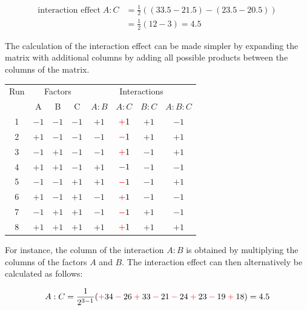 \begin{equation}
  \begin{split}
    \text{interaction effect}\; A:C &= \frac{1}{2}((33.5-21.5)-(23.5-20.5))\\
    &= \frac{1}{2}(12-3) = 4.5
  \end{split}
\end{equation}

The calculation of the interaction effect can be made simpler by expanding the matrix with additional columns by adding all possible
products between the columns of the matrix.
\begin{table}[H]
  \centering
  \scriptsize
  \begin{tabular}{c|ccc|cccc}
    Run & \multicolumn{3}{c}{Factors} & \multicolumn{4}{c}{Interactions} \\
        & A    & B    & C             & $A:B$ & $A:C$                         & $B:C$ & $A:B:C$  \\ \hline
     1  & $-1$ & $-1$ & $-1$          & $+1$  & $\color{red}+\color{black}1$  & $+1$  & $-1$ \\
     2  & $+1$ & $-1$ & $-1$          & $-1$  & $\color{red}-\color{black}1$  & $+1$  & $+1$ \\
     3  & $-1$ & $+1$ & $-1$          & $-1$  & $\color{red}+\color{black}1$  & $-1$  & $+1$ \\
     4  & $+1$ & $+1$ & $-1$          & $+1$  & $\color{red}-\color{black}1$  & $-1$  & $-1$ \\
     5  & $-1$ & $-1$ & $+1$          & $+1$  & $\color{red}-\color{black}1$  & $-1$  & $+1$ \\
     6  & $+1$ & $-1$ & $+1$          & $-1$  & $\color{red}+\color{black}1$  & $-1$  & $-1$ \\
     7  & $-1$ & $+1$ & $+1$          & $-1$  & $\color{red}-\color{black}1$  & $+1$  & $-1$ \\
     8  & $+1$ & $+1$ & $+1$          & $+1$  & $\color{red}+\color{black}1$  & $+1$  & $+1$ \\
  \end{tabular}
\end{table}
For instance, the column of the interaction $A:B$ is obtained by multiplying the columns of the factors $A$ and $B$. The interaction effect can then alternatively be calculated as follows:

\begin{equation}
  A:C = \frac{1}{2^{3-1}}(
  \color{red}+\color{black}34
  \color{red}-\color{black}26
  \color{red}+\color{black}33
  \color{red}-\color{black}21
  \color{red}-\color{black}24
  \color{red}+\color{black}23
  \color{red}-\color{black}19
  \color{red}+\color{black}18
  ) = 4.5
\end{equation}

